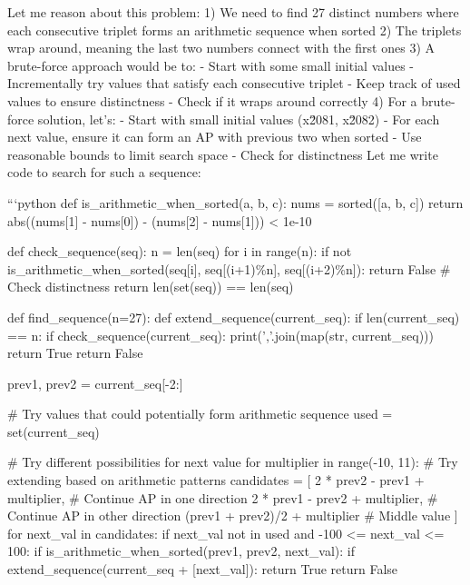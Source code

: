 \begingroup\raggedleft
\begin{claudels}{\claudeheader}
Let me reason about this problem:  
    1) We need to find 27 distinct numbers where each consecutive triplet forms an arithmetic sequence when sorted 
    2) The triplets wrap around, meaning the last two numbers connect with the first ones 
    3) A brute-force approach would be to:    
        - Start with some small initial values    
        - Incrementally try values that satisfy each consecutive triplet    
        - Keep track of used values to ensure distinctness    
        - Check if it wraps around correctly  
    4) For a brute-force solution, let's:    
        - Start with small initial values (x\u2081, x\u2082)    
        - For each next value, ensure it can form an AP with previous two when sorted    
        - Use reasonable bounds to limit search space    
        - Check for distinctness  
Let me write code to search for such a sequence:  

```python 
def is_arithmetic_when_sorted(a, b, c):     
    nums = sorted([a, b, c])     
    return abs((nums[1] - nums[0]) - (nums[2] - nums[1])) < 1e-10  

def check_sequence(seq):     
    n = len(seq)
    for i in range(n):
        if not is_arithmetic_when_sorted(seq[i], seq[(i+1)\%n], seq[(i+2)\%n]):             
            return False     
    # Check distinctness     
    return len(set(seq)) == len(seq)  

def find_sequence(n=27):     
    def extend_sequence(current_seq):         
        if len(current_seq) == n:             
            if check_sequence(current_seq):                 
                print(','.join(map(str, current_seq)))                 
                return True             
            return False 

        prev1, prev2 = current_seq[-2:]

        # Try values that could potentially form arithmetic sequence         
        used = set(current_seq)

        # Try different possibilities for next value         
        for multiplier in range(-10, 11):             
            # Try extending based on arithmetic patterns            
            candidates = [                 
                2 * prev2 - prev1 + multiplier,  # Continue AP in one direction                 
                2 * prev1 - prev2 + multiplier,  # Continue AP in other direction                 
                (prev1 + prev2)/2 + multiplier   # Middle value             
            ]                          
            for next_val in candidates:                 
                if next_val not in used and -100 <= next_val <= 100:                     
                    if is_arithmetic_when_sorted(prev1, prev2, next_val):                         
                        if extend_sequence(current_seq + [next_val]):                             
                            return True         
        return False   
       

\end{claudels}
